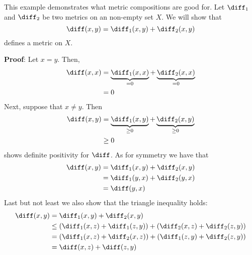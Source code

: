 \begin{exm}
	This example demonstrates what metric compositions are good for. Let $\diff_1$
	and $\diff_2$ be two metrics on an non-empty set $X$. We will show that
	\begin{equation*}
		\diff(x,y) = \diff_1(x,y)+ \diff_2(x,y)
	\end{equation*}
	defines a metric on $X$.
	\begin{flushleft}
		\textbf{Proof}: Let $x=y$. Then,
		\begin{align*}
			\diff(x,x) & = \underbrace{\diff_1(x,x)}_{=0} + \underbrace{\diff_2(x,x)}_{=0} \\
			           & = 0
		\end{align*}
		Next, suppose that $x\neq y$. Then
		\begin{align*}
			\diff(x,y) & = \underbrace{\diff_1(x,y)}_{\geq0} + \underbrace{\diff_2(x,y)}_{\geq0} \\
			           & \geq 0
		\end{align*}
		shows definite positivity for $\diff$. As for symmetry we have that
		\begin{align*}
			\diff(x,y) & = \diff_1(x,y) + \diff_2(x,y) \\
			           & = \diff_1(y,x) + \diff_2(y,x) \\
			           & = \diff(y,x)
		\end{align*}
		Last but not least we also show that the triangle inequality holds:
		\begin{align*}
			\diff(x,y) & = \diff_1(x,y) + \diff_2(x,y)                                                            \\
			           & \leq \left(\diff_1(x,z) + \diff_1(z,y)\right) + \left(\diff_2(x,z) + \diff_2(z,y)\right) \\
			           & = \left(\diff_1(x,z) + \diff_2(x,z)\right) + \left(\diff_1(z,y) + \diff_2(z,y)\right)    \\
			           & = \diff(x,z) + \diff(z,y)
		\end{align*}
	\end{flushleft}
\end{exm}

